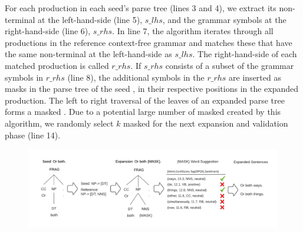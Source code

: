 


For each production in each seed's parse tree (lines 3 and 4), we
extract its non-terminal at the left-hand-side (line 5), $s\_lhs$, and
the grammar symbols at the right-hand-side (line 6), $s\_rhs$. In line
7, the algorithm iterates through all productions in the reference
context-free grammar and matches these that have the same non-terminal
at the left-hand-side as $s\_lhs$.  The right-hand-side of each
matched production is called $r\_rhs$.  If $s\_rhs$ consists of a
subset of the grammar symbols in $r\_rhs$ (line 8), the additional
symbols in the $r\_rhs$ are inserted as masks in the parse tree of
the seed \sent, in their respective positions in the expanded production.
The left to right traversal of the leaves of an expanded parse tree
forms a masked \sent.  Due to a potential large number of masked \sents created by this algorithm, we randomly select $k$
masked \sents for the next \sent expansion and validation phase (line 14).

\begin{figure}[t]
  \centering
  \includegraphics[scale=0.6]{figs/running_example.pdf}
  \vspace{-5mm}
  \caption{\RunningExCaption}
\end{figure}

